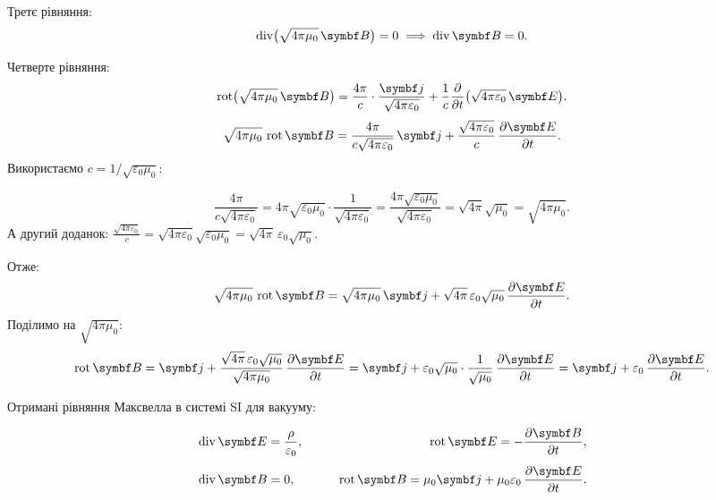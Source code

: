 Третє рівняння:
\begin{equation*}
	\Div\bigl( \sqrt{4\pi\mu_0}\,\Bfield \bigr) = 0 \;\Longrightarrow\; \Div\Bfield = 0.
\end{equation*}

\noindent Четверте рівняння:
\begin{equation*}
	\Rot\bigl( \sqrt{4\pi\mu_0}\,\Bfield \bigr) = \frac{4\pi}{c}\cdot\frac{\vect{j}}{\sqrt{4\pi\varepsilon_0}} + \frac{1}{c}\frac{\partial}{\partial t}\bigl( \sqrt{4\pi\varepsilon_0}\,\Efield \bigr).
\end{equation*}
\begin{equation*}
	\sqrt{4\pi\mu_0}\,\Rot\Bfield = \frac{4\pi}{c\sqrt{4\pi\varepsilon_0}}\,\vect{j} + \frac{\sqrt{4\pi\varepsilon_0}}{c}\,\frac{\partial \Efield}{\partial t}.
\end{equation*}
Використаємо \(c = 1/\sqrt{\varepsilon_0\mu_0}\):

\begin{equation*}
	\frac{4\pi}{c\sqrt{4\pi\varepsilon_0}} = 4\pi\sqrt{\varepsilon_0\mu_0}\cdot\frac{1}{\sqrt{4\pi\varepsilon_0}} = \frac{4\pi\sqrt{\varepsilon_0\mu_0}}{\sqrt{4\pi\varepsilon_0}} = \sqrt{4\pi}\sqrt{\mu_0} = \sqrt{4\pi\mu_0}.
\end{equation*}
А другий доданок: \(\frac{\sqrt{4\pi\varepsilon_0}}{c} = \sqrt{4\pi\varepsilon_0}\sqrt{\varepsilon_0\mu_0} = \sqrt{4\pi}\,\varepsilon_0\sqrt{\mu_0}\).

Отже:
\begin{equation*}
	\sqrt{4\pi\mu_0}\,\Rot\Bfield = \sqrt{4\pi\mu_0}\,\vect{j} + \sqrt{4\pi}\,\varepsilon_0\sqrt{\mu_0}\,\frac{\partial \Efield}{\partial t}.
\end{equation*}
Поділимо на \(\sqrt{4\pi\mu_0}\):
\begin{equation*}
	\Rot\Bfield = \vect{j} + \frac{\sqrt{4\pi}\,\varepsilon_0\sqrt{\mu_0}}{\sqrt{4\pi\mu_0}}\,\frac{\partial \Efield}{\partial t}
	= \vect{j} + \varepsilon_0\sqrt{\mu_0}\cdot\frac{1}{\sqrt{\mu_0}}\,\frac{\partial \Efield}{\partial t}
	= \vect{j} + \varepsilon_0\,\frac{\partial \Efield}{\partial t}.
\end{equation*}

Отримані рівняння Максвелла в системі SI для вакууму:

\begin{equation*}
	\begin{aligned}
		 & \Div\Efield = \frac{\rho}{\varepsilon_0}, \qquad
		 & \Rot\Efield = -\frac{\partial \Bfield}{\partial t},                                    \\[4pt]
		 & \Div\Bfield = 0, \qquad
		 & \Rot\Bfield = \mu_0\vect{j} + \mu_0\varepsilon_0\,\frac{\partial \Efield}{\partial t}.
	\end{aligned}
\end{equation*}


